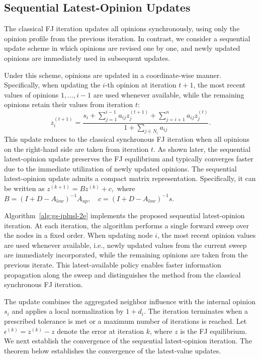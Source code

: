 \documentclass[sigconf,review, nonacm]{acmart}
\newcommand\cc{\boldsymbol{\mathit{c}}}
\newcommand\s{\boldsymbol{\mathit{s}}}
\newcommand\zz{\boldsymbol{\mathit{z}}}
\renewcommand\AA{\boldsymbol{\mathit{A}}}
\newcommand\BB{\boldsymbol{\mathit{B}}}
\newcommand\DD{\boldsymbol{\mathit{D}}}
\newcommand\II{\boldsymbol{\mathit{I}}}
\begin{document}
\subsection{Sequential Latest-Opinion Updates}
The classical FJ iteration updates all opinions synchronously, using only the opinion profile from the previous iteration.
In contrast, we consider a sequential update scheme in which opinions are revised one by one, and newly updated opinions are immediately used in subsequent updates.

Under this scheme, opinions are updated in a coordinate-wise manner.
Specifically, when updating the $i$-th opinion at iteration $t+1$, the most recent values of opinions $1,\dots,i-1$ are used whenever available, while the remaining opinions retain their values from iteration $t$:
\begin{equation}
	z_i^{(t+1)} =
	\frac
	{s_i
		+ \sum_{j=1}^{i-1} a_{ij} z_j^{(t+1)}
		+ \sum_{j=i+1}^{n} a_{ij} z_j^{(t)}}{1+\sum_{j\in N_i}a_{ij}}.
\end{equation}
This update reduces to the classical synchronous FJ iteration when all opinions on the right-hand side are taken from iteration $t$.
As shown later, the sequential latest-opinion update preserves the FJ equilibrium and typically converges faster due to the immediate utilization of newly updated opinions.
The sequential latest-opinion update admits a compact matrix representation.
Specifically, it can be written as
$	\zz^{(k+1)} = \BB \zz^{(k)} + \cc,
\label{eq:fixed_point_form}$
where
$\BB = (\II + \DD - \AA_{low})^{-1}\AA_{up}, \quad
\cc = (\II + \DD - \AA_{low})^{-1}\s.$

Algorithm~\ref{alg:gs-iplusl-2e} implements the proposed sequential latest-opinion iteration.
At each iteration, the algorithm performs a single forward sweep over the nodes in a fixed order.
When updating node $i$, the most recent opinion values are used whenever available, i.e., newly updated values from the current sweep are immediately incorporated, while the remaining opinions are taken from the previous iterate.
This latest-available policy enables faster information propagation along the sweep and distinguishes the method from the classical synchronous FJ iteration.

The update combines the aggregated neighbor influence with the internal opinion $s_i$ and applies a local normalization by $1+d_i$.
The iteration terminates when a prescribed tolerance is met or a maximum number of iterations is reached.
Let $\epsilon^{(k)} = \zz^{(k)} - \zz$ denote the error at iteration $k$, where $\zz$ is the FJ equilibrium.
We next establish the convergence of the sequential latest-opinion iteration.
The theorem below establishes the convergence of the latest-value updates.
\end{document}
